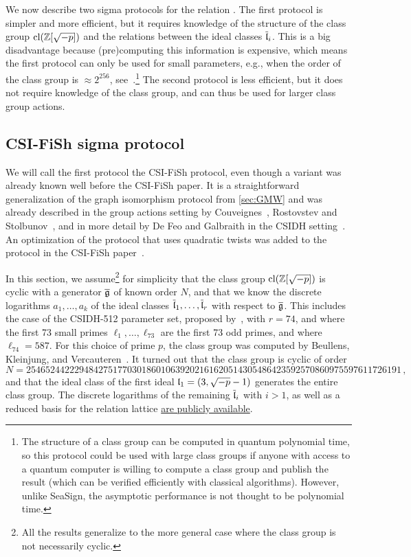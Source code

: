 We now describe two sigma protocols for the relation \R[CSIDH]. The first protocol is simpler and more efficient, but it requires knowledge of the structure of the class group $\text{cl}(\mathbb{Z}[\sqrt{-p}])$ and the relations between the ideal classes $\overline{\mathfrak{l}}_i$. This is a big disadvantage because (pre)computing this information is expensive, which means the first protocol can only be used for small parameters, e.g., when the order of the class group is $\approx 2^{256}$, see~\cite{CSI-FiSh}.\footnote{The structure of a class group can be computed in quantum polynomial time, so this protocol could be used with large class groups if anyone with access to a quantum computer is willing to compute a class group and publish the result (which can be verified efficiently with classical algorithms). However, unlike SeaSign, the asymptotic performance is not thought to be polynomial time.} The second protocol is less efficient, but it does not require knowledge of the class group, and can thus be used for larger class group actions.  

\subsection{CSI-FiSh sigma protocol}

We will call the first protocol the CSI-FiSh protocol, even though a variant was already known well before the CSI-FiSh paper. It is a straightforward generalization of the graph isomorphism protocol from \cref{sec:GMW} and was already described in the group actions setting by Couveignes~\cite{Couv06},  Rostovstev and Stolbunov~\cite{RosSto}, and in more detail by De Feo and Galbraith in the CSIDH setting~\cite{SeaSign}. An optimization of the protocol that uses quadratic twists was added to the protocol in the CSI-FiSh paper~\cite{CSI-FiSh}.


In this section, we assume\footnote{All the results generalize to the more general case where the class group is not necessarily cyclic.} for simplicity that the class group $\text{cl}(\mathbb{Z}[\sqrt{-p}])$ is cyclic with a generator $\overline{\mathfrak{g}}$ of known order $N$,  and that we know the discrete logarithms $a_1,\dots,a_k$ of the ideal classes $\overline{\mathfrak{l}}_1,\dots,\overline{\mathfrak{l}}_r$ with respect to $\overline{\mathfrak{g}}$. This includes the case of the CSIDH-512 parameter set, proposed by~\cite{CSIDH}, with $r = 74$, and where the first 73 small primes $\ell_1,\dots,\ell_{73}$ are the first 73 odd primes, and where $\ell_{74} = 587$. For this choice of prime $p$, the class group was computed by Beullens, Kleinjung, and Vercauteren~\cite{CSI-FiSh}. It turned out that the class group is cyclic of order \[N = {\scriptstyle 254652442229484275177030186010639202161620514305486423592570860975597611726191 } \, ,\] and that the ideal class of the first ideal $\mathfrak{l}_1 = (3,\sqrt{-p}-1) $ generates the entire class group. The discrete logarithms of the remaining $\overline{\mathfrak{l}}_i$ with $i > 1$, as well as a reduced basis for the relation lattice  \href{https://github.com/KULeuven-COSIC/CSI-FiSh/tree/master/classgroup_data}{are publicly available}.

